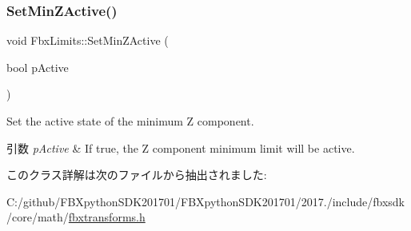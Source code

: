 \subsubsection{\texorpdfstring{Set\+Min\+Z\+Active()}{SetMinZActive()}}
{\footnotesize\ttfamily void Fbx\+Limits\+::\+Set\+Min\+Z\+Active (\begin{DoxyParamCaption}\item[{bool}]{p\+Active }\end{DoxyParamCaption})}

Set the active state of the minimum Z component. 
\begin{DoxyParams}{引数}
{\em p\+Active} & If true, the Z component minimum limit will be active. \\
\hline
\end{DoxyParams}


このクラス詳解は次のファイルから抽出されました\+:\begin{DoxyCompactItemize}
\item 
C\+:/github/\+F\+B\+Xpython\+S\+D\+K201701/\+F\+B\+Xpython\+S\+D\+K201701/2017./include/fbxsdk/core/math/\hyperlink{fbxtransforms_8h}{fbxtransforms.\+h}\end{DoxyCompactItemize}
